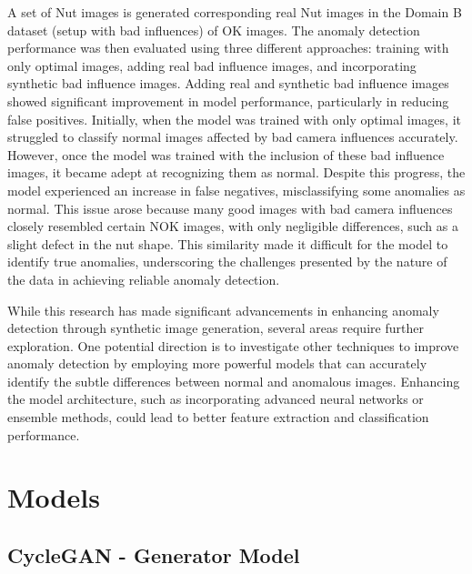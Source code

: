 \documentclass[12pt,DIV14,BCOR12mm,a4paper,footinclude=false,headinclude,parskip=half-,twoside,openright,cleardoublepage=empty,toc=index,bibliography=totoc,listof=totoc]{scrreprt}
\numberwithin{equation}{chapter}
\begin{document}
A set of Nut images is generated corresponding real Nut images in the Domain B dataset (setup with bad influences) of OK images. The anomaly detection performance was then evaluated using three different approaches: training with only optimal images, adding real bad influence images, and incorporating synthetic bad influence images. Adding real and synthetic bad influence images showed significant improvement in model performance, particularly in reducing false positives. Initially, when the model was trained with only optimal images, it struggled to classify normal images affected by bad camera influences accurately. However, once the model was trained with the inclusion of these bad influence images, it became adept at recognizing them as normal. Despite this progress, the model experienced an increase in false negatives, misclassifying some anomalies as normal. This issue arose because many good images with bad camera influences closely resembled certain NOK images, with only negligible differences, such as a slight defect in the nut shape. This similarity made it difficult for the model to identify true anomalies, underscoring the challenges presented by the nature of the data in achieving reliable anomaly detection.

While this research has made significant advancements in enhancing anomaly detection through synthetic image generation, several areas require further exploration. One potential direction is to investigate other techniques to improve anomaly detection by employing more powerful models that can accurately identify the subtle differences between normal and anomalous images. Enhancing the model architecture, such as incorporating advanced neural networks or ensemble methods, could lead to better feature extraction and classification performance.

\appendix
\chapter{Models}

\section{CycleGAN - Generator Model}
\label{appendix:generator_model}
\end{document}
